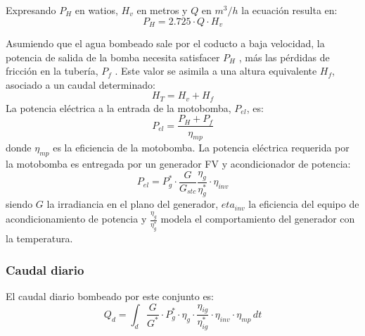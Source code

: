 Expresando \(P_H\) en watios, \(H_v\) en metros y \(Q\) en \(m^3/h\) la ecuación resulta en:
\begin{equation}
P_H=2.725\cdot Q \cdot H_v
\end{equation}

Asumiendo que el agua bombeado sale por el coducto a baja velocidad, la potencia de salida de la bomba necesita satisfacer \(P_H\) , más las pérdidas de fricción en la tubería, \(P_f\) . Este valor se asimila a una altura equivalente \(H_f\),  asociado a un caudal determinado: 
\begin{equation}
H_T=H_v+H_f
\end{equation}
La potencia eléctrica a la entrada de la motobomba, \(P_{el}\), es:
\begin{equation}
P_{el}=\frac{P_H+P_f}{\eta_{mp}} 
\end{equation}
donde \(\eta_{mp}\) es la eficiencia de la motobomba.
La potencia eléctrica requerida por la motobomba es entregada por un generador FV y acondicionador de potencia:
\begin{equation}
P_{el}=P_g^* \cdot \frac{G}{G_{stc}} \frac{\eta_g}{\eta_g^*} \cdot \eta_{inv}
\end{equation}
siendo \(G\) la irradiancia en el plano del generador, \(eta_{inv}\) la eficiencia del equipo de acondicionamiento de potencia y \(\frac{\eta_g}{\eta_g^*}\) modela el comportamiento del generador con la temperatura.

\subsubsection{Caudal diario}
\label{sec:org2bb1750}
El caudal diario bombeado por este conjunto es:
\begin{equation}
Q_d = \int_{d} \frac{G}{G^*} \cdot P_g^* \cdot \eta_g \cdot \frac{\eta_{ig}}{\eta_{ig}^*} \cdot \eta_{inv} \cdot \eta_{mp} \, dt
\end{equation}

